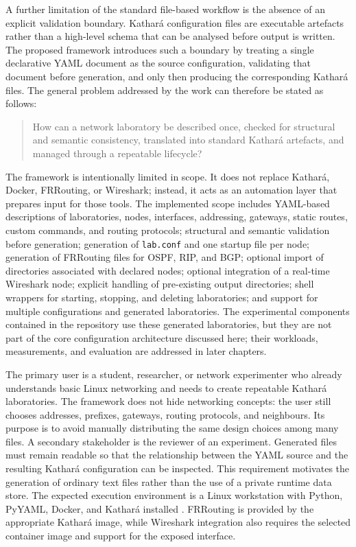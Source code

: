 A further limitation of the standard file-based workflow is the absence of an
explicit validation boundary. Kathar\'a configuration files are executable
artefacts rather than a high-level schema that can be analysed before output
is written. The proposed framework introduces such a boundary by treating a
single declarative YAML document as the source configuration, validating that
document before generation, and only then producing the corresponding
Kathar\'a files. The general problem addressed by the work can therefore be
stated as follows:

\begin{quote}
How can a network laboratory be described once, checked for structural and
semantic consistency, translated into standard Kathar\'a artefacts, and
managed through a repeatable lifecycle?
\end{quote}

The framework is intentionally limited in scope. It does not replace Kathar\'a,
Docker, FRRouting, or Wireshark; instead, it acts as an automation layer that
prepares input for those tools. The implemented scope includes YAML-based
descriptions of laboratories, nodes, interfaces, addressing, gateways, static
routes, custom commands, and routing protocols; structural and semantic
validation before generation; generation of \texttt{lab.conf} and one startup
file per node; generation of FRRouting files for OSPF, RIP, and BGP; optional
import of directories associated with declared nodes; optional integration of
a real-time Wireshark node; explicit handling of pre-existing output
directories; shell wrappers for starting, stopping, and deleting laboratories;
and support for multiple configurations and generated laboratories. The
experimental components contained in the repository use these generated
laboratories, but they are not part of the core configuration architecture
discussed here; their workloads, measurements, and evaluation are addressed in
later chapters.

The primary user is a student, researcher, or network experimenter who already
understands basic Linux networking and needs to create repeatable Kathar\'a
laboratories. The framework does not hide networking concepts: the user still
chooses addresses, prefixes, gateways, routing protocols, and neighbours. Its
purpose is to avoid manually distributing the same design choices among many
files. A secondary stakeholder is the reviewer of an experiment. Generated
files must remain readable so that the relationship between the YAML source
and the resulting Kathar\'a configuration can be inspected. This requirement
motivates the generation of ordinary text files rather than the use of a
private runtime data store. The expected execution environment is a Linux
workstation with Python, PyYAML, Docker, and Kathar\'a installed
\cite{pyyaml_docs,docker_overview,kathara_website}. FRRouting is
provided by the appropriate Kathar\'a image, while Wireshark integration also
requires the selected container image and support for the exposed interface.

